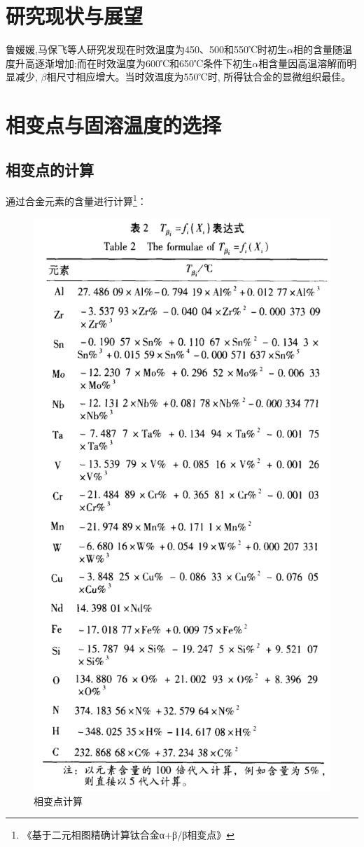\documentclass[
class = book,
zihao = -4,
font = noto,
paper = a4paper,
openany
]{easybook}
\begin{document}
\section{研究现状与展望}
 鲁媛媛,马保飞等人研究发现在时效温度为450、500和550℃时初生$\alpha $相的含量随温度升高逐渐增加;而在时效温度为600℃和650℃条件下初生$\alpha $相含量因高温溶解而明显减少, $\beta $相尺寸相应增大。当时效温度为550℃时, 所得钛合金的显微组织最佳\cite{timing}。



\section{相变点与固溶温度的选择}
\subsection{相变点的计算}
通过合金元素的含量进行计算\footnote{《基于二元相图精确计算钛合金α+β/β相变点》}：
\begin{figure}[h!]
	\centering
	\includegraphics[width=0.8\linewidth]{相变点计算}
	\caption{相变点计算}
	\label{fig:keypoint}
\end{figure}
\end{document}
